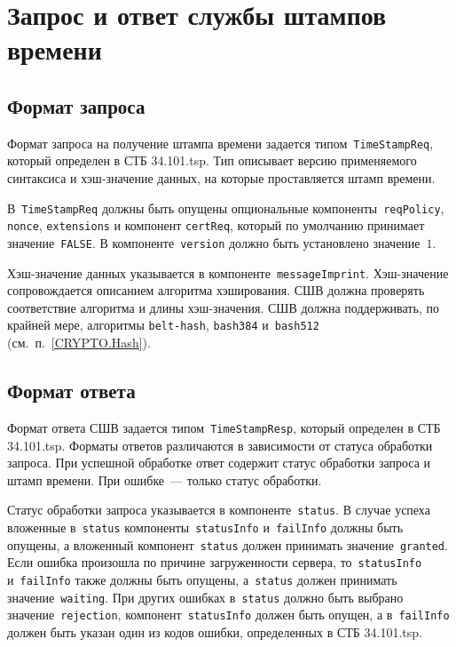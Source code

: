 \section{Запрос и ответ службы штампов времени}\label{FMT.TSP}

\subsection{Формат запроса}

Формат запроса на получение штампа времени задается 
типом~\texttt{TimeStampReq}, который определен 
в СТБ 34.101.tsp. Тип описывает версию применяемого синтаксиса и 
хэш-значение данных, на которые проставляется штамп времени.

В~\texttt{TimeStampReq} должны быть опущены опциональные 
компоненты~\texttt{reqPolicy}, \texttt{nonce}, \texttt{extensions} и компонент 
\texttt{certReq}, который по умолчанию принимает значение~\texttt{FALSE}. 
%
В компоненте~\texttt{version} должно быть установлено значение~$1$.

Хэш-значение данных указывается в компоненте~\texttt{messageImprint}.
Хэш-значение сопровождается описанием алгоритма хэширования.
СШВ должна проверять соответствие алгоритма и длины хэш-значения.
СШВ должна поддерживать, по крайней мере, алгоритмы \texttt{belt-hash},
\texttt{bash384} и~\texttt{bash512} (см.~п.~\ref{CRYPTO.Hash}).

\subsection{Формат ответа}
 
Формат ответа СШВ задается типом~\texttt{TimeStampResp}, который определен 
в СТБ 34.101.tsp. Форматы ответов различаются в зависимости от статуса 
обработки запроса. При успешной обработке ответ содержит статус обработки 
запроса и штамп времени. При ошибке~--- только статус обработки.

Статус обработки запроса указывается в компоненте~\texttt{status}.
%
В случае успеха вложенные в~\texttt{status} компоненты~\texttt{statusInfo} 
и~\texttt{failInfo} должны быть опущены, а вложенный
компонент~\texttt{status} должен принимать значение~\texttt{granted}.
%
Если ошибка произошла по причине загруженности сервера, 
то~\texttt{statusInfo} и~\texttt{failInfo} также должны быть опущены, 
а~\texttt{status} должен принимать значение~\texttt{waiting}.
%
При других ошибках в~\texttt{status} должно быть выбрано 
значение~\texttt{rejection}, компонент~\texttt{statusInfo}
должен быть опущен, а в~\texttt{failInfo} должен быть указан один из 
кодов ошибки, определенных в СТБ 34.101.tsp.

